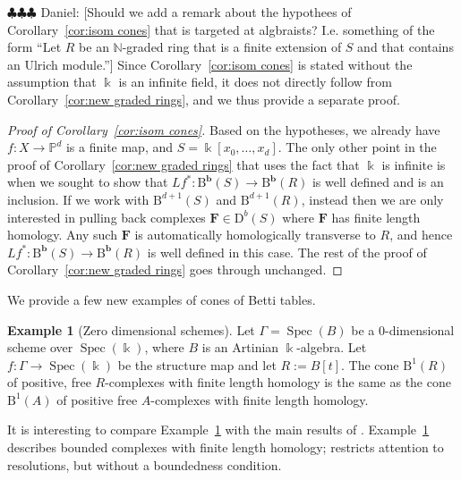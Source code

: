 \documentclass[12pt]{amsart}
\theoremstyle{definition}
\newtheorem{example}[lemma]{Example}
\theoremstyle{remark}
\newcommand{\Spec}{\operatorname{Spec}}
\newcommand{\kk}{\Bbbk}
\newcommand{\PP}{\mathbb{P}}
\newcommand{\NN}{\mathbb{N}}
\newcommand{\bb}{\mathbf{b}}
\newcommand{\FF}{\mathbf{F}}
\newcommand{\DD}{\mathrm{D}}
\newcommand{\BBQ}{\mathrm{B}}
\newcommand{\daniel}[1]{{\color{green} \sf $\clubsuit\clubsuit\clubsuit$ Daniel: [#1]}}
\begin{document}
\daniel{Should we add a remark about the hypothees of Corollary~\ref{cor:isom cones} that is targeted at algbraists?  I.e. something of the form ``Let $R$ be an $\NN$-graded ring that is a finite extension of $S$ and that contains an Ulrich module.''}
Since Corollary~\ref{cor:isom cones} is stated without the assumption that $\kk$ is an infinite field, it does not directly follow from Corollary~\ref{cor:new graded rings}, and we thus provide a separate proof.
\begin{proof}[Proof of Corollary~\ref{cor:isom cones}]
Based on the hypotheses, we already have $f\colon X\to \PP^d$ is a finite map, and $S=\kk[x_0, \dots, x_d]$.  The only other point in the proof of Corollary~\ref{cor:new graded rings} that uses the fact that $\kk$ is infinite is when we sought to show that $Lf^*: \BBQ^{\bb}(S)\to \BBQ^{\bb}(R)$ is well defined and is an inclusion.  If we work with $\BBQ^{d+1}(S)$ and $\BBQ^{d+1}(R)$, instead then we are only interested in pulling back complexes $\FF\in \DD^b(S)$ where $\FF$ has finite length homology.  Any such $\FF$ is automatically homologically transverse to $R$, and hence $Lf^*: \BBQ^{\bb}(S)\to \BBQ^{\bb}(R)$ is well defined in this case.  The rest of the proof of Corollary~\ref{cor:new graded rings} goes through unchanged.
\end{proof}


We provide a few new examples of cones of Betti tables.

\begin{example}[Zero dimensional schemes]\label{ex:zero dim}Let $\Gamma=\Spec(B)$ be a $0$-dimensional scheme over $\Spec(\kk)$, where $B$ is an Artinian $\kk$-algebra.  Let $f\colon \Gamma\to \Spec(\kk)$ be the structure map and let $R:=B[t]$.  The cone $\BBQ^1(R)$ of positive, free $R$-complexes with finite length homology is the same as the cone $\BBQ^1(A)$ of positive free $A$-complexes with finite length homology.  
\end{example}

It is interesting to compare Example~\ref{ex:zero dim} with the main results of \cite{bbeg}.  Example~\ref{ex:zero dim} describes bounded complexes with finite length homology; \cite{bbeg} restricts attention to resolutions, but without a boundedness condition.
\end{document}
